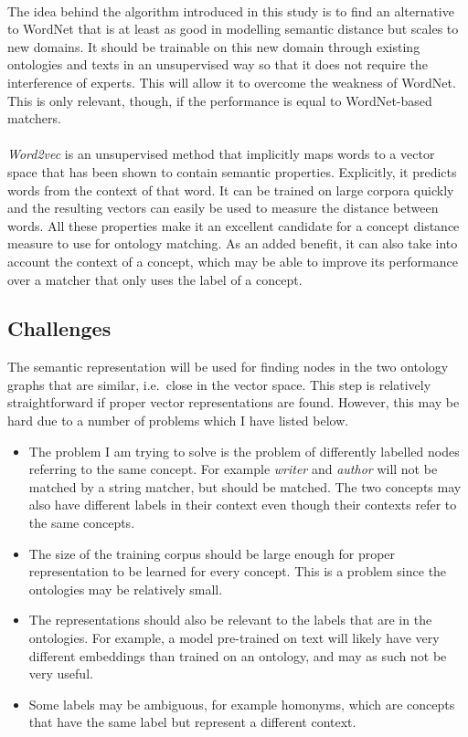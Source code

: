 \documentclass{article}
\begin{document}
 \paragraph{}
 The idea behind the algorithm introduced in this study is to find an alternative to WordNet that is at least as good in modelling semantic distance but scales to new domains. It should be trainable on this new domain through existing ontologies and texts in an unsupervised way so that it does not require the interference of experts. This will allow it to overcome the weakness of WordNet. This is only relevant, though, if the performance is equal to WordNet-based matchers.
 \paragraph{}
 \emph{Word2vec} is an unsupervised method that implicitly maps words to a vector space that has been shown to contain semantic properties. Explicitly, it predicts words from the context of that word\cite{w2v}.
 It can be trained on large corpora quickly and the resulting vectors can easily be used to measure the distance between words. All these properties make it an excellent candidate for a concept distance measure to use for ontology matching. As an added benefit, it can also take into account the context of a concept, which may be able to improve its performance over a matcher that only uses the label of a concept. 
 
 \subsection{Challenges}
 The semantic representation will be used for finding nodes in the two ontology graphs that are similar, i.e.\ close in the vector space. This step is relatively straightforward if proper vector representations are found. However, this may be hard due to a number of problems which I have listed below.

 \begin{itemize}
  \item The problem I am trying to solve is the problem of differently labelled nodes referring to the same concept. For example \emph{writer} and \emph{author} will not be matched by a string matcher, but should be matched. The two concepts may also have different labels in their context even though their contexts refer to the same concepts.
  \item The size of the training corpus should be large enough for proper representation to be learned for every concept. This is a problem since the ontologies may be relatively small. 
  \item The representations should also be relevant to the labels that are in the ontologies. For example, a model pre-trained on text will likely have very different embeddings than trained on an ontology, and may as such not be very useful.
  \item Some labels may be ambiguous, for example homonyms, which are concepts that have the same label but represent a different context.
 \end{itemize}
 
\end{document}
